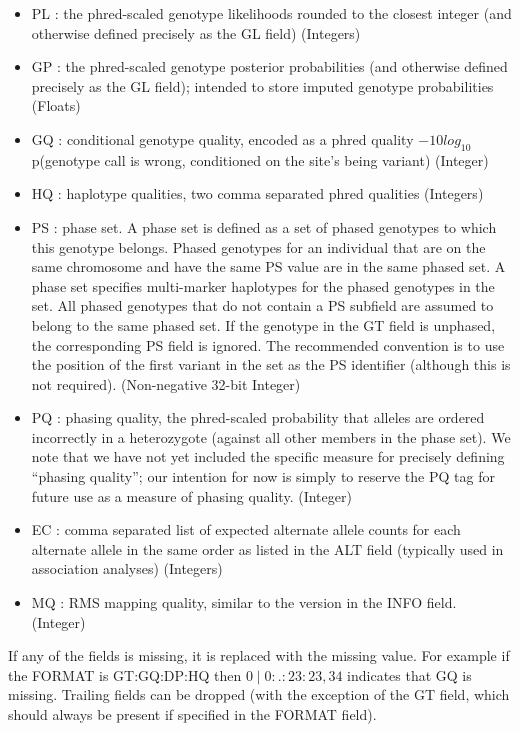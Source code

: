\documentclass[8pt]{article}
\begin{document}
\begin{itemize}
  \item PL : the phred-scaled genotype likelihoods rounded to the closest integer (and otherwise defined precisely as the GL field) (Integers)
  \item GP : the phred-scaled genotype posterior probabilities (and otherwise defined precisely as the GL field); intended to store imputed genotype probabilities (Floats)
  \item GQ : conditional genotype quality, encoded as a phred quality $-10log_{10}$ p(genotype call is wrong, conditioned on the site's being variant) (Integer)
  \item HQ : haplotype qualities, two comma separated phred qualities (Integers)
  \item PS : phase set.  A phase set is defined as a set of phased genotypes to which this genotype belongs.  Phased genotypes for an individual that are on the same chromosome and have the same PS value are in the same phased set.  A phase set specifies multi-marker haplotypes for the phased genotypes in the set.  All phased genotypes that do not contain a PS subfield are assumed to belong to the same phased set.  If the genotype in the GT field is unphased, the corresponding PS field is ignored.  The recommended convention is to use the position of the first variant in the set as the PS identifier (although this is not required). (Non-negative 32-bit Integer)
  \item PQ : phasing quality, the phred-scaled probability that alleles are ordered incorrectly in a heterozygote (against all other members in the phase set).  We note that we have not yet included the specific measure for precisely defining ``phasing quality''; our intention for now is simply to reserve the PQ tag for future use as a measure of phasing quality. (Integer)
  \item EC : comma separated list of expected alternate allele counts for each alternate allele in the same order as listed in the ALT field (typically used in association analyses) (Integers)
  \item MQ : RMS mapping quality, similar to the version in the INFO field. (Integer)
\end{itemize}

If any of the fields is missing, it is replaced with the missing value. For example if the FORMAT is GT:GQ:DP:HQ then $0\mid0:.:23:23,34$ indicates that GQ is missing. Trailing fields can be dropped (with the exception of the GT field, which should always be present if specified in the FORMAT field).
\end{document}
